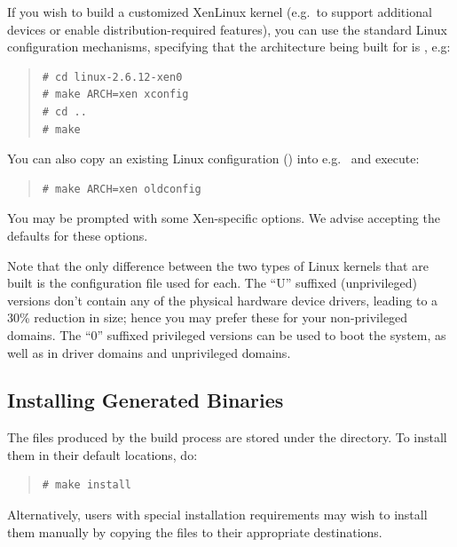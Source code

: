 \documentclass[11pt,twoside,final,openright]{report}
\begin{document}

If you wish to build a customized XenLinux kernel (e.g.\ to support
additional devices or enable distribution-required features), you can
use the standard Linux configuration mechanisms, specifying that the
architecture being built for is , e.g:
\begin{quote}
\begin{verbatim}
# cd linux-2.6.12-xen0
# make ARCH=xen xconfig
# cd ..
# make
\end{verbatim}
\end{quote}

You can also copy an existing Linux configuration () into
e.g.\  and execute:
\begin{quote}
\begin{verbatim}
# make ARCH=xen oldconfig
\end{verbatim}
\end{quote}

You may be prompted with some Xen-specific options. We advise accepting
the defaults for these options.

Note that the only difference between the two types of Linux kernels
that are built is the configuration file used for each. The ``U''
suffixed (unprivileged) versions don't contain any of the physical
hardware device drivers, leading to a 30\% reduction in size; hence you
may prefer these for your non-privileged domains. The ``0'' suffixed
privileged versions can be used to boot the system, as well as in driver
domains and unprivileged domains.

\subsection{Installing Generated Binaries}

The files produced by the build process are stored under the
 directory. To install them in their default
locations, do:
\begin{quote}
\begin{verbatim}
# make install
\end{verbatim}
\end{quote}

Alternatively, users with special installation requirements may wish to
install them manually by copying the files to their appropriate
destinations.
\end{document}
